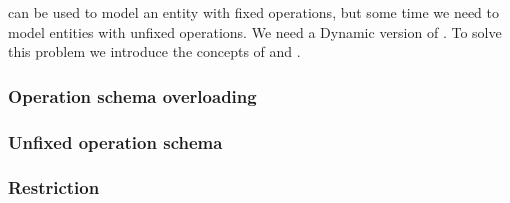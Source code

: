 \oz{} can be used to model an entity with fixed operations, but some time we need to model entities with unfixed operations. We need a Dynamic version of \oz{}. To solve this problem we introduce the concepts of  and .
\subsubsection{Operation schema overloading}


\subsubsection{Unfixed operation schema}


\subsubsection{Restriction}
